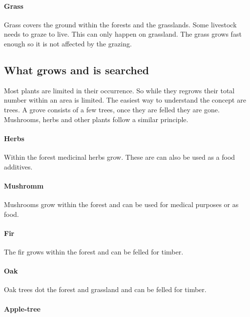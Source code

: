 \paragraph{Grass}

Grass covers the ground within the forests and the grasslands. Some livestock
needs to graze to live. This can only happen on grassland. The grass grows fast
enough so it is not affected by the grazing.

\subsection{What grows and is searched}\label{ch:Goods:Nature:Plants:Limited}

Most plants are limited in their occurrence. So while they regrows their total
number within an area is limited. The easiest way to understand the concept are
trees. A grove consists of a few trees, once they are felled they are gone.
Mushrooms, herbs and other plants follow a similar principle.

\paragraph{Herbs}

Within the forest medicinal herbs grow. These are can also be used as a food
additives.

\paragraph{Mushromm}

Mushrooms grow within the forest and can be used for medical purposes or as
food.

\paragraph{Fir}

The fir grows within the forest and can be felled for timber.

\paragraph{Oak}

Oak trees dot the forest and grassland and can be felled for timber.

\paragraph{Apple-tree}

